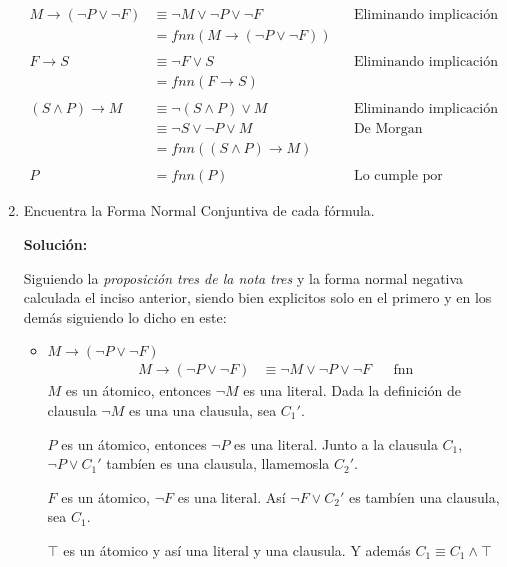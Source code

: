 \documentclass[8pt, letterpaper]{article}
\begin{document}
\begin{enumerate}
  \begin{align*}
    M\rightarrow (\neg P \lor \neg F) &\equiv \neg M  \lor
    \neg P \lor \neg F & &\text{Eliminando implicación}\\
    &= fnn(M\rightarrow (\neg P \lor \neg F))\\
    & & &\\
    F\rightarrow S &\equiv \neg F \lor S & &\text{Eliminando implicación}\\
    &= fnn(F\rightarrow S)\\
    & & &\\
    (S\land P) \rightarrow M &\equiv \neg (S\land P) \lor M &
    &\text{Eliminando implicación}\\
    &\equiv \neg S \lor \neg P \lor M & &\text{De Morgan}\\
    &= fnn((S\land P) \rightarrow M) \\
    & & &\\
    P &= fnn(P) & &\text{Lo cumple por definición}
  \end{align*}
  \newpage
  \rmfamily
\item Encuentra la Forma Normal Conjuntiva de cada fórmula.

  \hfill\break
  \ttfamily
  {\bf Solución:}

  Siguiendo la \textit{proposición tres de la nota tres} y la forma normal
  negativa calculada el inciso anterior, siendo bien explicitos solo en el
  primero y en los demás siguiendo lo dicho en este:
  \begin{itemize}
  \item $M\rightarrow (\neg P \lor \neg F)$
    \begin{align*}
      M\rightarrow (\neg P \lor \neg F) &\equiv \neg M  \lor
      \neg P \lor \neg F & &\text{fnn}
    \end{align*}
    $M$ es un átomico, entonces $\neg M$ es una literal. Dada la definición de
    clausula $\neg M$ es una  una clausula, sea $C_1'$.

    \hfill\break
    $P$ es un átomico, entonces $\neg P$ es una literal. Junto a la clausula
    $C_1$, $\neg P \lor C_1'$ tambíen es una clausula, llamemosla $C_2'$.

    \hfill\break
    $F$ es un átomico, $\neg F$ es una literal. Así $\neg F \lor C_2'$ es
    tambíen una clausula, sea $C_1$.

    \hfill\break
    $\top$  es un átomico y así una literal y una clausula. Y además
    $C_1 \equiv C_1 \land\top$


\end{itemize}
\end{enumerate}
\end{document}
